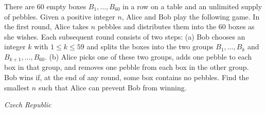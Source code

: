 There are 60 empty boxes $B_1,\ldots,B_{60}$ in a row on a table and an unlimited supply of pebbles. Given a positive integer $n$, Alice and Bob play the following game.
In the first round, Alice takes $n$ pebbles and distributes them into the 60 boxes as she wishes. Each subsequent round consists of two steps:
(a) Bob chooses an integer $k$ with $1\leq k\leq 59$ and splits the boxes into the two groups $B_1,\ldots,B_k$ and $B_{k+1},\ldots,B_{60}$.
(b) Alice picks one of these two groups, adds one pebble to each box in that group, and removes one pebble from each box in the other group.
Bob wins if, at the end of any round, some box contains no pebbles. Find the smallest $n$ such that Alice can prevent Bob from winning.

\textit{Czech Republic}